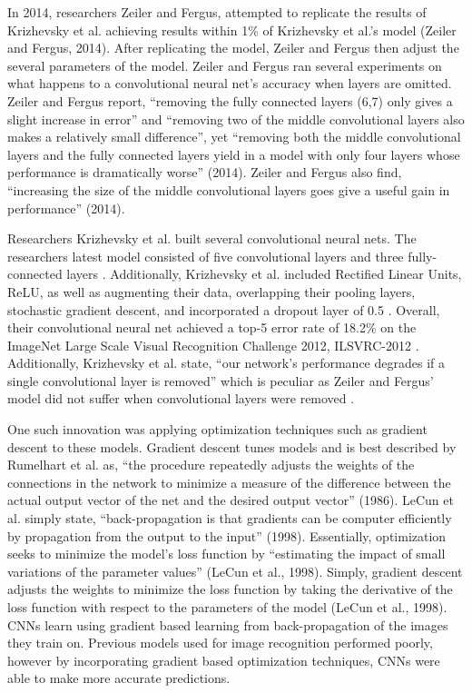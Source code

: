\documentclass[12pt,english]{article}
\begin{document}
In 2014, researchers Zeiler and Fergus, attempted to replicate the results of Krizhevsky et al. achieving results within 1\% of Krizhevsky et al.’s model (Zeiler and Fergus, 2014). After replicating the model, Zeiler and Fergus then adjust the several parameters of the model. Zeiler and Fergus ran several experiments on what happens to a convolutional neural net’s accuracy when layers are omitted. Zeiler and Fergus report, “removing the fully connected layers (6,7) only gives a slight increase in error” and “removing two of the middle convolutional layers also makes a relatively small difference”, yet “removing both the middle convolutional layers and the fully connected layers yield in a model with only four layers whose performance is dramatically worse” (2014). Zeiler and Fergus also find, “increasing the size of the middle convolutional layers goes give a useful gain in performance” (2014).\par

Researchers Krizhevsky et al. built several convolutional neural nets. The researchers latest model consisted of five convolutional layers and three fully-connected layers \cite{NIPS2012_4824}. Additionally, Krizhevsky et al. included Rectified Linear Units, ReLU, as well as augmenting their data, overlapping their pooling layers, stochastic gradient descent, and incorporated a dropout layer of 0.5 \cite{NIPS2012_4824}. Overall, their convolutional neural net achieved a top-5 error rate of 18.2\% on the ImageNet Large Scale Visual Recognition Challenge 2012, ILSVRC-2012 \cite{NIPS2012_4824}. Additionally, Krizhevsky et al. state, “our network’s performance degrades if a single convolutional layer is removed” which is peculiar as Zeiler and Fergus’ model did not suffer when convolutional layers were removed \cite{NIPS2012_4824}.\par

One such innovation was applying optimization techniques such as gradient descent to these models. Gradient descent tunes models and is best described by Rumelhart et al. as, “the procedure repeatedly adjusts the weights of the connections in the network to minimize a measure of the difference between the actual output vector of the net and the desired output vector” (1986). LeCun et al. simply state, “back-propagation is that gradients can be computer efficiently by propagation from the output to the input” (1998). Essentially, optimization seeks to minimize the model’s loss function by “estimating the impact of small variations of the parameter values” (LeCun et al., 1998). Simply, gradient descent adjusts the weights to minimize the loss function by taking the derivative of the loss function with respect to the parameters of the model (LeCun et al., 1998). CNNs learn using gradient based learning from back-propagation of the images they train on. Previous models used for image recognition performed poorly, however by incorporating gradient based optimization techniques, CNNs were able to make more accurate predictions. \par
\end{document}
